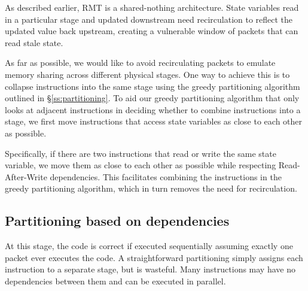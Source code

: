 As described earlier, RMT is a shared-nothing architecture. State variables
read in a particular stage and updated downstream need recirculation to reflect
the updated value back upstream, creating a vulnerable window of packets that
can read stale state.

As far as possible, we would like to avoid recirculating packets to emulate
memory sharing across different physical stages. One way to achieve this is to
collapse instructions into the same stage using the greedy partitioning
algorithm outlined in \S\ref{ss:partitioning}. To aid our greedy partitioning
algorithm that only looks at adjacent instructions in deciding whether to
combine instructions into a stage, we first move instructions that access state
variables as close to each other as possible.

Specifically, if there are two instructions that read or write the same state
variable, we move them as close to each other as possible while respecting
Read-After-Write dependencies. This facilitates combining the instructions in
the greedy partitioning algorithm, which in turn removes the need for
recirculation.

\subsection{Partitioning based on dependencies}

At this stage, the code is correct if executed sequentially assuming exactly
one packet ever executes the code. A straightforward partitioning simply
assigns each instruction to a separate stage, but is wasteful. Many
instructions may have no dependencies between them and can be executed in
parallel.

